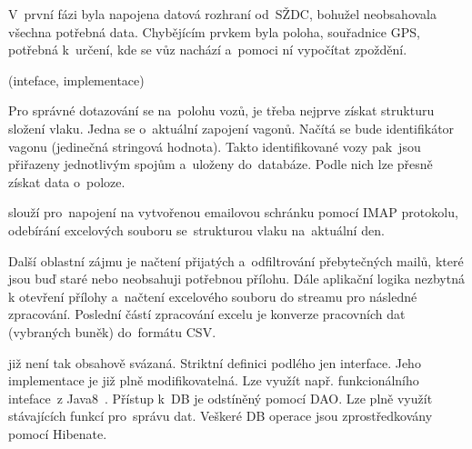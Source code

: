 V~první fázi byla napojena datová rozhraní od~SŽDC, bohužel neobsahovala všechna potřebná data. Chybějícím prvkem byla poloha, souřadnice GPS, potřebná k~určení, kde se vůz nachází a~pomoci ní vypočítat zpoždění.

 (inteface, implementace)
	

Pro správné dotazování se na~polohu vozů, je třeba nejprve získat strukturu složení vlaku. Jedna se o~aktuální zapojení vagonů. Načítá se bude identifikátor vagonu (jedinečná stringová hodnota). Takto identifikované vozy pak~jsou přiřazeny jednotlivým spojům a~uloženy do~databáze. Podle nich lze přesně získat data o~poloze.

	
	
	
	
	
	
 slouží pro~napojení na vytvořenou emailovou schránku pomocí IMAP protokolu, odebírání excelových souboru se~strukturou vlaku na~aktuální den.
	
	
Další oblastní zájmu je načtení přijatých a~odfiltrování přebytečných mailů, které jsou buď staré nebo neobsahuji potřebnou přílohu. Dále aplikační logika nezbytná k otevření přílohy a~načtení excelového souboru do streamu pro následné zpracování. Poslední částí zpracování excelu je konverze pracovních dat (vybraných buněk) do~formátu CSV.
	
	
 již není tak obsahově svázaná. Striktní definici podlého jen interface. Jeho implementace je již plně modifikovatelná. Lze využít např. funkcionálního inteface~z Java8~\cite{java8}. Přístup k~DB je odstíněný pomocí DAO. Lze plně využít stávajících funkcí pro~správu dat. Veškeré DB operace jsou zprostředkovány pomocí Hibenate.
	
